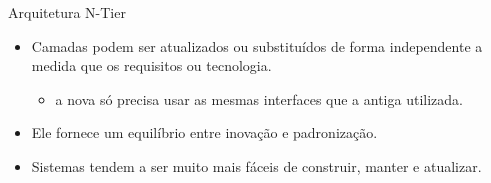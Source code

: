 \begin{frame}{Arquitetura N-Tier}
\begin{itemize}
\begin{itemize}
      \item Camadas podem ser atualizados ou substituídos de forma \alert{independente} 
	a medida que os requisitos ou tecnologia.
      \begin{itemize}
       \item  a nova só precisa usar as \alert{mesmas interfaces} que a antiga utilizada. 
      \end{itemize}
      \item Ele fornece um \alert{equilíbrio} entre inovação e padronização. 
      \item Sistemas tendem a ser muito mais \alert{fáceis} de construir, manter e atualizar.
    \end{itemize}
  \end{itemize}

\end{frame}
